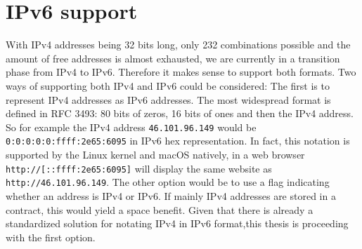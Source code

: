 \section{IPv6 support}

With IPv4 addresses being 32 bits long, only 232 combinations possible and the amount of free addresses is almost exhausted, we are currently in a transition phase from IPv4 to IPv6. Therefore it makes sense to support both formats. Two ways of supporting both IPv4 and IPv6 could be considered:
The first is to represent IPv4 addresses as IPv6 addresses. The most widespread format is defined in RFC 3493: 80 bits of zeros, 16 bits of ones and then the IPv4 address. So for example the IPv4 address \texttt{46.101.96.149} would be \texttt{0:0:0:0:0:ffff:2e65:6095} in IPv6 hex representation. In fact, this notation is supported by the Linux kernel and macOS natively, in a web browser \texttt{http://[::ffff:2e65:6095]} will display the same website as \texttt{http://46.101.96.149}.
The other option would be to use a flag indicating whether an address is IPv4 or IPv6. If mainly IPv4 addresses are stored in a contract, this would yield a space benefit.
Given that there is already a standardized solution for notating IPv4 in IPv6 format,this thesis is proceeding with the first option.


